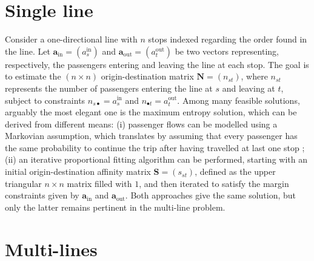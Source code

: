\documentclass{bmcart}
\begin{document}
%
\section{Single line}
%

Consider a one-directional line with $n$ stops indexed regarding the order found in the line.  Let $\mathbf{a}_\text{in} = (a_{s}^\text{in})$ and $\mathbf{a}_\text{out} = (a_{t}^\text{out})$ be two vectors representing, respectively, the passengers entering and leaving the line at each stop. The goal is to estimate the $(n \times n)$ origin-destination matrix $\mathbf{N} = (n_{st})$, where $n_{st}$ represents the number of passengers entering the line at $s$ and leaving at $t$, subject to constraints $n_{s\bullet} = a^\text{in}_s$ and $n_{\bullet t} = a^\text{out}_t$.  Among many feasible solutions, arguably the most elegant one is the maximum entropy solution, which can be derived  from different means:  (i) passenger flows can be modelled using a Markovian assumption, which translates by assuming that every passenger has the same probability to continue the trip after having travelled at last one stop ; (ii) an iterative proportional fitting algorithm can be performed, starting with an initial origin-destination affinity matrix $\mathbf{S} = (s_{st})$, defined as the upper triangular $n\times n$ matrix filled with $1$, and then iterated to satisfy the margin constraints given by $\mathbf{a}_\text{in}$ and $\mathbf{a}_\text{out}$. Both approaches give the same solution, but only the latter remains pertinent in the multi-line problem.

%
\section{Multi-lines}
%
\end{document}
